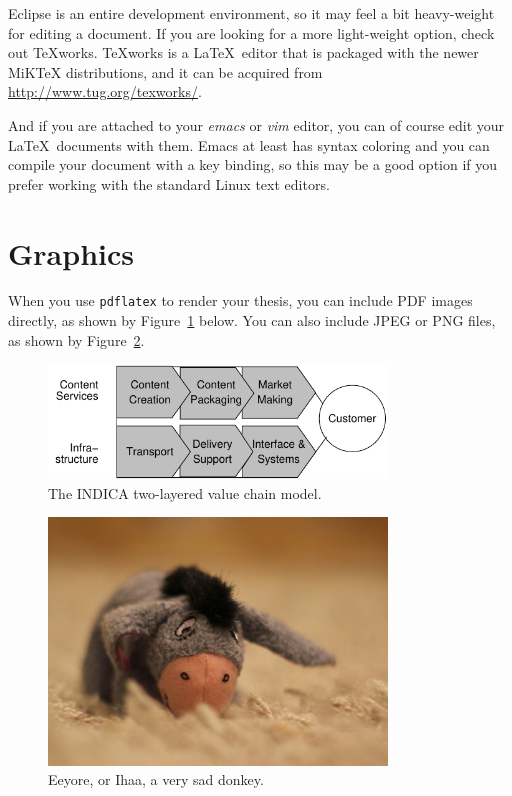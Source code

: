 Eclipse is an entire development environment, so it may feel a bit heavy-weight
for editing a document. 
If you are looking for a more light-weight option, check out TeXworks. 
TeXworks is a \LaTeX\ editor that is packaged with the newer MiKTeX
distributions, and it can be acquired from \url{http://www.tug.org/texworks/}.

And if you are attached to your \emph{emacs} or \emph{vim} editor, you
can of course edit your \LaTeX\ documents with them. 
Emacs at least has syntax coloring and you can compile your document with a key
binding, so this may be a good option if you prefer working with the standard
Linux text editors.

\section{Graphics}

When you use \texttt{pdflatex} to render your thesis, you can include
PDF images directly, as shown by Figure~\ref{fig:indica_model}
below. You can also include JPEG or PNG files, as shown by
Figure~\ref{fig:eeyore}.

\begin{figure}[ht]
  \begin{center}
    \includegraphics[width=0.80\textwidth]{images/indica_model.pdf} 
    \caption{The INDICA two-layered value chain model.}
    \label{fig:indica_model}
  \end{center}
\end{figure}


\begin{figure}[ht]
  \begin{center}
    \includegraphics[width=9cm]{images/ihaa.jpg}
    \caption{Eeyore, or Ihaa, a very sad donkey.}
    \label{fig:eeyore}
  \end{center}
\end{figure}

